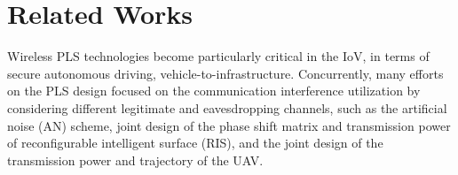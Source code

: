 \section{Related Works}
\label{sec:related work}


Wireless PLS technologies become particularly critical in the IoV, in terms of secure autonomous driving, vehicle-to-infrastructure. Concurrently, many efforts on the PLS design focused on the communication interference utilization by considering different legitimate and eavesdropping channels, such as the artificial noise (AN) scheme, joint design of the phase shift matrix and transmission power of reconfigurable intelligent surface (RIS), and the joint design of the transmission power and trajectory of the UAV.

\iffalse
\sout{Wireless PLS becomes particularly critical in the IoV, in terms of secure autonomous driving, vehicle-to-infrastructure communication, and emergency communication. Concurrently, many efforts on the PLS design focused on the communication interference utilization by considering different legitimate and eavesdropping channels. }From the perspective of communication interference utilization and trajectory optimization, the most representative methods includes AN-based BF design, joint design of the phase shift matrix and moving trajectory of IRS, joint design of the transmit power and trajectory of the UAV, and joint design of the BF and moving trajectory of the movable antenna (MA). 
\fi

